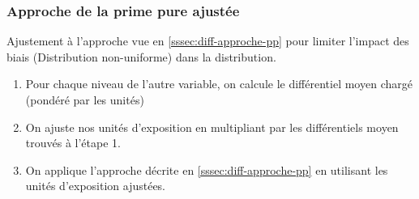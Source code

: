 \subsubsection{Approche de la prime pure ajustée}
Ajustement à l'approche vue en \ref{sssec:diff-approche-pp} pour limiter l'impact des biais (Distribution non-uniforme) dans la distribution.
\begin{enumerate}
\item Pour chaque niveau de l'autre variable, on calcule le différentiel moyen chargé (pondéré par les unités)
\item On ajuste nos unités d'exposition en multipliant par les différentiels moyen trouvés à l'étape 1.
\item On applique l'approche décrite en \ref{sssec:diff-approche-pp} en utilisant les unités d'exposition ajustées.
\end{enumerate}